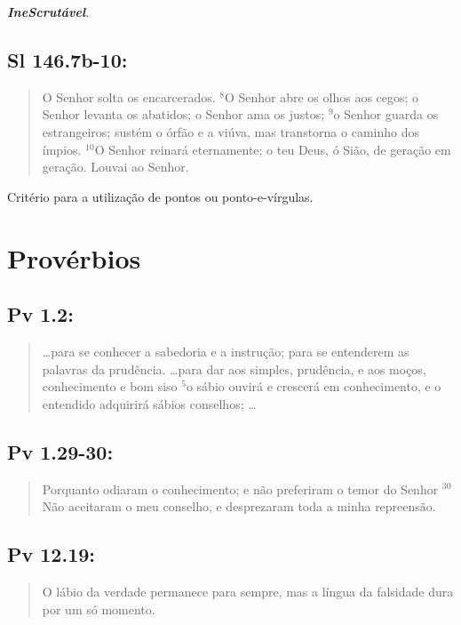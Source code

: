 \textit{\textbf{IneScrutável}}.

\subsection*{Sl 146.7b-10:} 
 \begin{quote}
    \small
 O Senhor solta os encarcerados. $^{\mathrm{8}}$O Senhor abre os olhos aos cegos; o Senhor levanta os abatidos; o Senhor ama os justos; $^{\mathrm{9}}$o Senhor guarda os estrangeiros; sustém o órfão e a viúva, mas transtorna o caminho dos ímpios. $^{\mathrm{10}}$O Senhor reinará eternamente; o teu Deus, ó Sião, de geração em geração. Louvai ao Senhor.
\end{quote}

Critério para a utilização de pontos ou ponto-e-vírgulas.

\section{Provérbios}
\subsection*{Pv 1.2:} 
 \begin{quote}
    \small
 \ldots para se conhecer a sabedoria e a instrução; para se entenderem\uwave{,} as palavras da prudência. \ldots para dar aos simples, prudência, e aos moços, conhecimento e bom siso\uwave{;} $^{\mathrm{5}}$o sábio ouvirá e crescerá em conhecimento, e o entendido adquirirá sábios conselhos; \ldots
\end{quote}

\subsection*{Pv 1.29-30:} 
\begin{quote} 
 \small 
Porquanto odiaram o conhecimento; e não preferiram o temor do Senhor\uwave{:} $^{\mathrm{30}}$Não aceitaram o meu conselho, e desprezaram toda a minha repreensão.
\end{quote}

\subsection*{Pv 12.19:} 
 \begin{quote} 
 \small 
 O lábio da verdade permanece para sempre, mas a língua da falsidade\uwave{,} dura por um só momento.
\end{quote}

